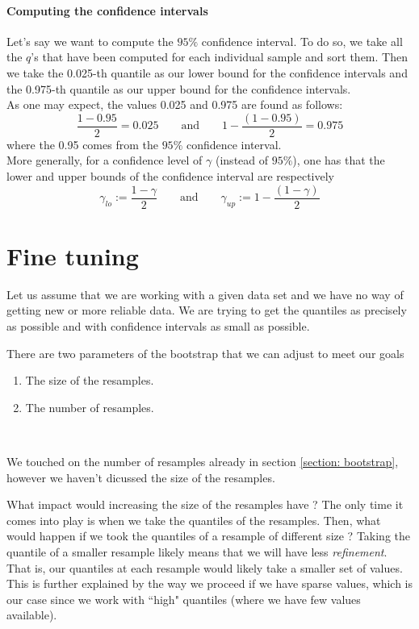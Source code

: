 \documentclass{article}
\begin{document}
\paragraph{Computing the confidence intervals} Let's say we want to compute the $95\%$ confidence interval. To do so, we take all the $q$'s that have been computed for each individual sample and sort them. Then we take the 0.025-th quantile as our lower bound for the confidence intervals and the 0.975-th quantile as our upper bound for the confidence intervals. \\
As one may expect, the values 0.025 and 0.975 are found as follows:
\[
    \frac{1 - 0.95}{2} = 0.025 \qquad \mbox{and} \qquad 1 - \frac{(1 - 0.95)}{2} = 0.975
\]
where the 0.95 comes from the $95\%$ confidence interval. \\
More generally, for a confidence level of $\gamma$ (instead of $95\%$), one has that the lower and upper bounds of the confidence interval are respectively
\[
    \gamma_{lo} := \frac{1 - \gamma}{2} \qquad \mbox{and} \qquad \gamma_{up} := 1 - \frac{(1 - \gamma)}{2}
\]

\section{Fine tuning}
Let us assume that we are working with a given data set and we have no way of getting new or more reliable data. We are trying to get the quantiles as precisely as possible and with confidence intervals as small as possible.

There are two parameters of the bootstrap that we can adjust to meet our goals
\begin{enumerate}
    \item The size of the resamples.
    \item The number of resamples.
\end{enumerate}\

We touched on the number of resamples already in section \ref{section: bootstrap}, however we haven't dicussed the size of the resamples.

What impact would increasing the size of the resamples have ? The only time it comes into play is when we take the quantiles of the resamples. Then, what would happen if we took the quantiles of a resample of different size ? Taking the quantile of a smaller resample likely means that we will have less \textit{refinement}. That is, our quantiles at each resample would likely take a smaller set of values. This is further explained by the way we proceed if we have sparse values, which is our case since we work with ``high" quantiles (where we have few values available).
\end{document}
